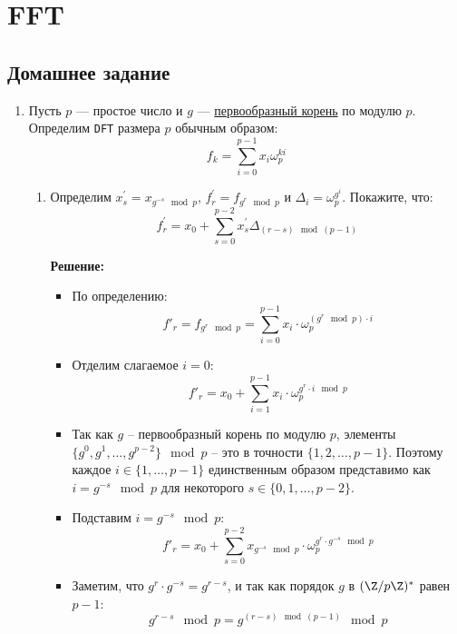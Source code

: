 \section{FFT}

\subsection{Домашнее задание}
\begin{enumerate}

  \item
    Пусть $p$ --- простое число и $g$ ---
    \href{https://ru.wikipedia.org/wiki/%D0%9F%D0%B5%D1%80%D0%B2%D0%BE%D0%BE%D0%B1%D1%80%D0%B0%D0%B7%D0%BD%D1%8B%D0%B9_%D0%BA%D0%BE%D1%80%D0%B5%D0%BD%D1%8C_(%D1%82%D0%B5%D0%BE%D1%80%D0%B8%D1%8F_%D1%87%D0%B8%D1%81%D0%B5%D0%BB)}{первообразный корень}
    по модулю $p$. Определим \texttt{DFT} размера $p$ обычным образом: $$f_k = \sum_{i=0}^{p-1} x_i \omega_{p}^{k i}$$

    \begin{enumerate}
      \item
        Определим $x^{\prime}_s = x_{g^{-s} \mod p}$, $f^{\prime}_r = f_{g^{r} \mod p}$ и $\Delta_{i} = \omega_{p}^{g^i}$.
        Покажите, что: $$f^{\prime}_{r} = x_{0} + \sum_{s = 0}^{p - 2} x^{\prime}_{s} \Delta_{(r - s) \mod (p - 1)}$$

        \textbf{Решение:}

        \begin{itemize}
          \item По определению:
          $$f'_r = f_{g^r \mod p} = \sum_{i=0}^{p-1} x_i \cdot \omega_p^{(g^r \mod p) \cdot i}$$

          \item Отделим слагаемое $i = 0$:
          $$f'_r = x_0 + \sum_{i=1}^{p-1} x_i \cdot \omega_p^{g^r \cdot i \mod p}$$

          \item Так как $g$ -- первообразный корень по модулю $p$, элементы $\{g^0, g^1, \ldots, g^{p-2}\} \mod p$ -- это в точности $\{1, 2, \ldots, p-1\}$. Поэтому каждое $i \in \{1, \ldots, p-1\}$ единственным образом представимо как $i = g^{-s} \mod p$ для некоторого $s \in \{0, 1, \ldots, p-2\}$.

          \item Подставим $i = g^{-s} \mod p$:
          $$f'_r = x_0 + \sum_{s=0}^{p-2} x_{g^{-s} \mod p} \cdot \omega_p^{g^r \cdot g^{-s} \mod p}$$

          \item Заметим, что $g^r \cdot g^{-s} = g^{r-s}$, и так как порядок $g$ в $(\Z/p\Z)^*$ равен $p - 1$:
          $$g^{r-s} \mod p = g^{(r - s) \mod (p-1)} \mod p$$


\end{itemize}
\end{enumerate}
\end{enumerate}
